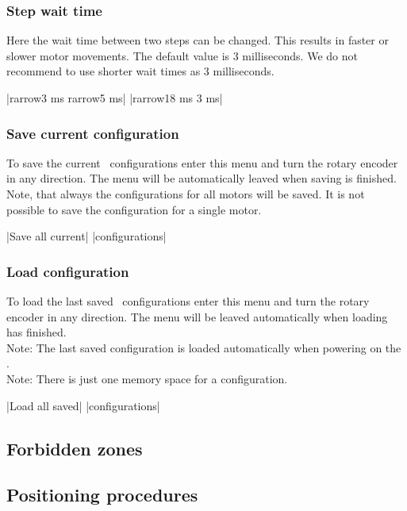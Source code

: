 \subsubsection{Step wait time}
\label{menu_step_wait_time}
Here the wait time between two steps can be changed. This results in
faster or slower motor movements. The default value is 3 milliseconds.
We do not recommend to use shorter wait times as 3 milliseconds.
\begin{center}
  |{rarrow}3 ms   {rarrow}5 ms|
             |{rarrow}18 ms   3 ms|
\end{center}

\subsubsection{Save current configuration}
\label{menu_save}
To save the current \productName ~configurations enter this menu and
turn the rotary encoder in any direction. The menu will be automatically
leaved when saving is finished.\\
Note, that always the configurations for all motors will be saved. It is not
possible to save the configuration for a single motor.
\begin{center}
  |Save all current|
             |configurations|
\end{center}


\subsubsection{Load configuration}
\label{chp:menu_load}
To load the last saved \productName ~configurations enter this menu
and turn the rotary encoder in any direction. The menu will be leaved
automatically when loading has
finished.\\
Note: The last saved configuration is loaded automatically when
powering on the \productName.\\
Note: There is just one memory space for a configuration.
\begin{center}
  |Load all saved|
             |configurations|
\end{center}


\subsection{Forbidden zones}
\label{chp:forbidden_zone}

\subsection{Positioning procedures}
\label{chp:positioning_procedure}








\newpage
